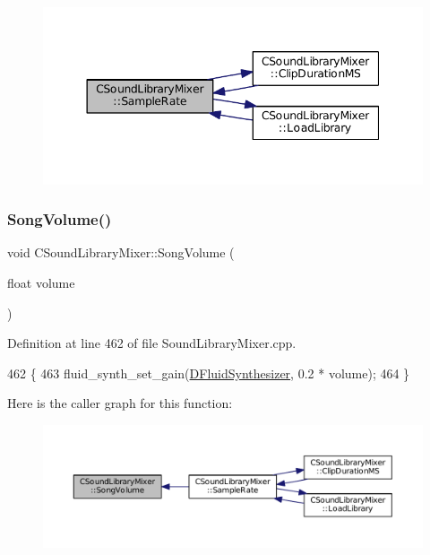 \begin{figure}[H]
\begin{center}
\leavevmode
\includegraphics[width=344pt]{classCSoundLibraryMixer_a03221f151dfe72381da5d0d0539bab94_icgraph}
\end{center}
\end{figure}
\hypertarget{classCSoundLibraryMixer_ad38d70e5783e3b67fdf022877549ccf8}{}\label{classCSoundLibraryMixer_ad38d70e5783e3b67fdf022877549ccf8} 
\subsubsection{\texorpdfstring{Song\+Volume()}{SongVolume()}}
{\footnotesize\ttfamily void C\+Sound\+Library\+Mixer\+::\+Song\+Volume (\begin{DoxyParamCaption}\item[{float}]{volume }\end{DoxyParamCaption})}



Definition at line 462 of file Sound\+Library\+Mixer.\+cpp.


\begin{DoxyCode}
462                                                \{
463     fluid\_synth\_set\_gain(\hyperlink{classCSoundLibraryMixer_a6c1663c381dbf2aa18c82a23141f409c}{DFluidSynthesizer}, 0.2 * volume);
464 \}
\end{DoxyCode}
Here is the caller graph for this function\+:
\nopagebreak
\begin{figure}[H]
\begin{center}
\leavevmode
\includegraphics[width=350pt]{classCSoundLibraryMixer_ad38d70e5783e3b67fdf022877549ccf8_icgraph}
\end{center}
\end{figure}
\hypertarget{classCSoundLibraryMixer_a13fdebfbc5fdee60067c38a3c60dd2a9}{}\label{classCSoundLibraryMixer_a13fdebfbc5fdee60067c38a3c60dd2a9} 
